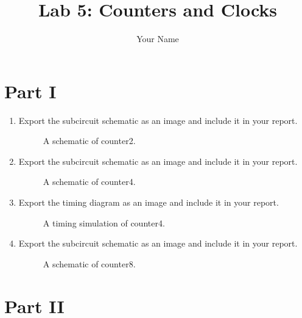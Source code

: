 \documentclass{article}
\title{Lab 5: Counters and Clocks}
\author{Your Name}
\begin{document}
\maketitle

\section{Part I}

\begin{enumerate}
\item Export the subcircuit schematic as an image and include it in your report.

\begin{figure}[ht!]
    \centering
    \caption{A schematic of counter2.}
    \label{f:counter2}
\end{figure}

\item Export the subcircuit schematic as an image and include it in your report.

\begin{figure}[ht!]
    \centering
    \caption{A schematic of counter4.}
    \label{f:counter4}
\end{figure}

\item Export the timing diagram as an image and include it in your report.

\begin{figure}[ht!]
    \centering
    \caption{A timing simulation of counter4.}
    \label{f:counter4_timing}
\end{figure}

\item Export the subcircuit schematic as an image and include it in your report.

\begin{figure}[ht!]
    \centering
    \caption{A schematic of counter8.}
    \label{f:counter8}
\end{figure}

\end{enumerate}

\section{Part II}
\end{document}
